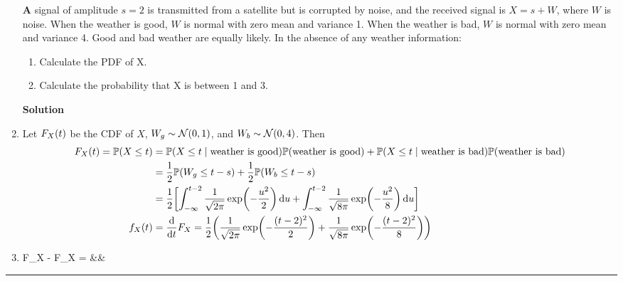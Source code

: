 \documentclass{article}
\newcommand{\diff}[1]{\mathrm{d}#1}    %
\newcommand{\prob}[1]{\mathbb{P}\paren{ #1 }}
\DeclarePairedDelimiter{\paren}{(}{)}
\DeclarePairedDelimiter{\brac}{[}{]}
\newenvironment{problem}[1]    %
{
	\begin{enumerate}[leftmargin = 0in]
		\item[\bfseries{#1}]
}
{	\end{enumerate}
}
\newenvironment{multipart}
{
	\begin{enumerate}[leftmargin = *, align = left, label = {\alph*.}, topsep = 0pt]
}	
{
	\end{enumerate}
}
\newenvironment{solution}    %
{
	\begin{enumerate}[leftmargin = 0in]
		\item[\bfseries{Solution}]
}
{
	\end{enumerate}
}
\newenvironment{nospaceflalign*}    %
{
	\setlength{\abovedisplayskip}{-\baselineskip}
	\csname flalign*\endcsname
}
{
	\csname endflalign*\endcsname
}
\begin{document}
	\begin{problem}{8}
		A signal of amplitude $s = 2$ is transmitted from a satellite but is corrupted by noise, and the received signal is $X = s + W$, where $W$ is noise. When the weather is good, $W$ is normal with zero mean and variance 1. When the weather is bad, $W$ is normal with zero mean and variance 4. Good and bad weather are equally likely. In the absence of any weather information:
		\begin{multipart}
			\item Calculate the PDF of X.
			\item Calculate the probability that X is between 1 and 3.
		\end{multipart}
	\end{problem}
	
	\begin{solution}
		\item Let $F_X\paren{t}$ be the CDF of $X$, $W_g \sim \mathcal{N}\paren{0, 1}$, and $W_b \sim \mathcal{N}\paren{0, 4}$. Then
			\begin{align*}
				F_X\paren{t} = \mathbb{P}\paren{X \leq t} &= \prob{X \leq t \mid \text{weather is good}}\prob{\text{weather is good}} + \prob{X \leq t \mid \text{weather is bad}}\prob{\text{weather is bad}} \\
				&= \frac{1}{2}\prob{W_g \leq t - s} + \frac{1}{2}\prob{W_b \leq t - s} \\
				&= \frac{1}{2}\brac[\bigg]{\int_{-\infty}^{t - 2} \frac{1}{\sqrt{2\pi}}\exp\paren[\bigg]{-\frac{u^2}{2}} \,\diff{u} + \int_{-\infty}^{t - 2} \frac{1}{\sqrt{8\pi}}\exp\paren[\bigg]{-\frac{u^2}{8}} \,\diff{u}} \\
				f_X\paren{t} &= \frac{\diff}{\diff{t}} F_X = \frac{1}{2}\paren[\bigg]{\frac{1}{\sqrt{2\pi}}\exp\paren[\bigg]{-\frac{\paren{t - 2}^2}{2}} + \frac{1}{\sqrt{8\pi}}\exp\paren[\bigg]{-\frac{\paren{t - 2}^2}{8}}}
			\end{align*}
		\item
			\begin{nospaceflalign*}
 				F_X - F_X = \brac[\bigg]{\int_{-1}^{1} \frac{1}{\sqrt{2\pi}}\exp\paren[\bigg]{-\frac{u^2}{2}} \,\diff{u} + \int_{-1}^{1} \frac{1}{\sqrt{8\pi}}\exp\paren[\bigg]{-\frac{u^2}{8}} \,\diff{u}}  &&
 			\end{nospaceflalign*}

	\end{solution}
	
\hrule %
\end{document}
